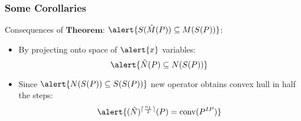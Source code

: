 \documentclass{beamer}
\DeclarePairedDelimiter{\ceil}{\lceil}{\rceil}
\DeclareMathOperator{\conv}{conv}
\begin{document}
\begin{frame}
\frametitle{Some Corollaries}
Consequences of $\textbf{Theorem:}$ $\alert{S(\hat{M}(P)) \subseteq M(S(P))}$:
\begin{itemize}
\item By projecting onto space of $\alert{x}$ variables: $$\alert{\tilde{N}(P) \subseteq N(S(P))}$$
\item Since $\alert{N(S(P)) \subseteq S(S(P))}$ new operator obtains convex hull in half the steps: $$\alert{(\tilde{N})^{\ceil{\frac{n_1}{2}}}(P) = \conv(P^{IP})}$$
\end{itemize}
\end{frame}
\end{document}
